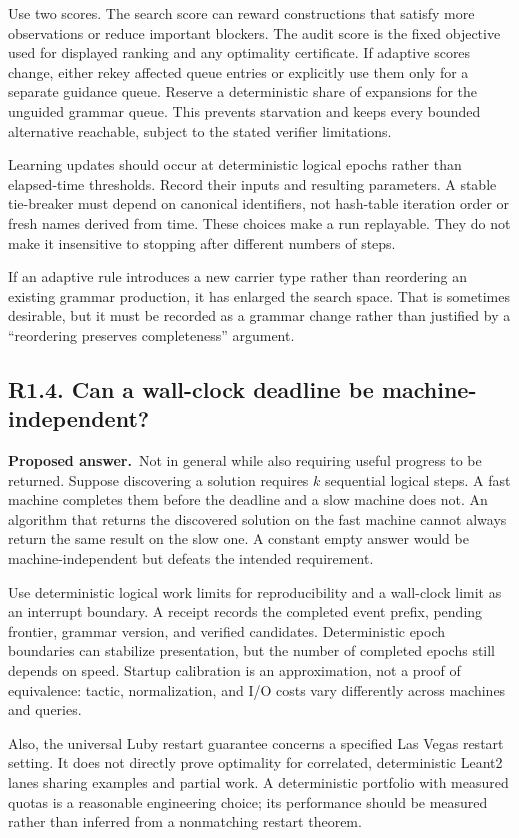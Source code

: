 \documentclass[11pt,a4paper]{article}
\newcommand{\question}[2]{\subsection{#1. #2}\label{q:#1}}
\newcommand{\answer}{\textbf{Proposed answer.}\ }
\theoremstyle{remark}
\begin{document}
Use two scores. The search score can reward constructions that satisfy more
observations or reduce important blockers. The audit score is the fixed
objective used for displayed ranking and any optimality certificate. If
adaptive scores change, either rekey affected queue entries or explicitly
use them only for a separate guidance queue. Reserve a deterministic share
of expansions for the unguided grammar queue. This prevents starvation and
keeps every bounded alternative reachable, subject to the stated verifier
limitations.

Learning updates should occur at deterministic logical epochs rather than
elapsed-time thresholds. Record their inputs and resulting parameters. A
stable tie-breaker must depend on canonical identifiers, not hash-table
iteration order or fresh names derived from time. These choices make a run
replayable. They do not make it insensitive to stopping after different
numbers of steps.

If an adaptive rule introduces a new carrier type rather than reordering an
existing grammar production, it has enlarged the search space. That is
sometimes desirable, but it must be recorded as a grammar change rather than
justified by a ``reordering preserves completeness'' argument.

\question{R1.4}{Can a wall-clock deadline be machine-independent?}

\answer Not in general while also requiring useful progress to be returned.
Suppose discovering a solution requires $k$ sequential logical steps. A fast
machine completes them before the deadline and a slow machine does not. An
algorithm that returns the discovered solution on the fast machine cannot
always return the same result on the slow one. A constant empty answer would
be machine-independent but defeats the intended requirement.

Use deterministic logical work limits for reproducibility and a wall-clock
limit as an interrupt boundary. A receipt records the completed event prefix,
pending frontier, grammar version, and verified candidates. Deterministic
epoch boundaries can stabilize presentation, but the number of completed
epochs still depends on speed. Startup calibration is an approximation, not
a proof of equivalence: tactic, normalization, and I/O costs vary differently
across machines and queries.

Also, the universal Luby restart guarantee concerns a specified Las Vegas
restart setting. It does not directly prove optimality for correlated,
deterministic Leant2 lanes sharing examples and partial work.\cite{luby}
A deterministic portfolio with measured quotas is a reasonable engineering
choice; its performance should be measured rather than inferred from a
nonmatching restart theorem.
\end{document}
